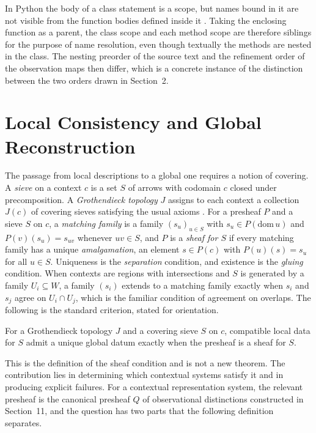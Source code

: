\begin{remark}
In Python the body of a class statement is a scope, but names bound in it are not visible from the function bodies defined inside it \cite{pyref}. Taking the enclosing function as a parent, the class scope and each method scope are therefore siblings for the purpose of name resolution, even though textually the methods are nested in the class. The nesting preorder of the source text and the refinement order of the observation maps then differ, which is a concrete instance of the distinction between the two orders drawn in Section~2.
\end{remark}

\section{Local Consistency and Global Reconstruction}

The passage from local descriptions to a global one requires a notion of covering. A \emph{sieve} on a context $c$ is a set $S$ of arrows with codomain $c$ closed under precomposition. A \emph{Grothendieck topology} $J$ assigns to each context a collection $J(c)$ of covering sieves satisfying the usual axioms \cite{maclanemoerdijk}. For a presheaf $P$ and a sieve $S$ on $c$, a \emph{matching family} is a family $(s_u)_{u\in S}$ with $s_u\in P(\mathrm{dom}\,u)$ and $P(v)(s_u)=s_{uv}$ whenever $uv\in S$, and $P$ is a \emph{sheaf for $S$} if every matching family has a unique \emph{amalgamation}, an element $s\in P(c)$ with $P(u)(s)=s_u$ for all $u\in S$. Uniqueness is the \emph{separation} condition, and existence is the \emph{gluing} condition. When contexts are regions with intersections and $S$ is generated by a family $U_i\subseteq W$, a family $(s_i)$ extends to a matching family exactly when $s_i$ and $s_j$ agree on $U_i\cap U_j$, which is the familiar condition of agreement on overlaps. The following is the standard criterion, stated for orientation.

\begin{proposition}\label{prop:gluing}
For a Grothendieck topology $J$ and a covering sieve $S$ on $c$, compatible local data for $S$ admit a unique global datum exactly when the presheaf is a sheaf for $S$.
\end{proposition}

This is the definition of the sheaf condition and is not a new theorem. The contribution lies in determining which contextual systems satisfy it and in producing explicit failures. For a contextual representation system, the relevant presheaf is the canonical presheaf $Q$ of observational distinctions constructed in Section~11, and the question has two parts that the following definition separates.

